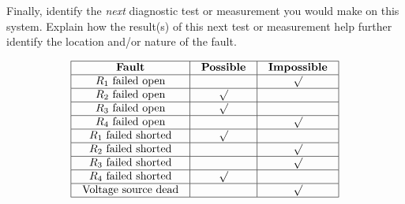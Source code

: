 Finally, identify the {\it next} diagnostic test or measurement you would make on this system.  Explain how the result(s) of this next test or measurement help further identify the location and/or nature of the fault.

\vfil 

\eject







$$\vbox{\offinterlineskip
\halign{\strut
\vrule \quad\hfil # \ \hfil & 
\vrule \quad\hfil # \ \hfil & 
\vrule \quad\hfil # \ \hfil \vrule \cr
\noalign{\hrule}
%
{\bf Fault} & {\bf Possible} & {\bf Impossible} \cr
%
\noalign{\hrule}
%
$R_1$ failed open &  & $\surd$ \cr
%
\noalign{\hrule}
%
$R_2$ failed open & $\surd$ &  \cr
%
\noalign{\hrule}
%
$R_3$ failed open & $\surd$ &  \cr
%
\noalign{\hrule}
%
$R_4$ failed open &  & $\surd$ \cr
%
\noalign{\hrule}
%
$R_1$ failed shorted & $\surd$ &  \cr
%
\noalign{\hrule}
%
$R_2$ failed shorted &  & $\surd$ \cr
%
\noalign{\hrule}
%
$R_3$ failed shorted &  & $\surd$ \cr
%
\noalign{\hrule}
%
$R_4$ failed shorted & $\surd$ &  \cr
%
\noalign{\hrule}
%
Voltage source dead &  & $\surd$ \cr
%
\noalign{\hrule}
} %
}$$ %











